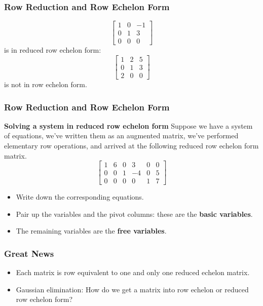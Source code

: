   \begin{frame}[fragile]\frametitle{Row Reduction and Row Echelon Form}
\[
\begin{bmatrix}
 1 & 0 & -1 \\
 0 & 1 & 3 \\
 0 & 0 & 0
\end{bmatrix}
\] 
is in reduced row echelon form:
\[
\begin{bmatrix}
 1 & 2 & 5 \\
 0 & 1 & 3 \\
 2 & 0 & 0
\end{bmatrix}
\] 
is not in row echelon form.
\end{frame}

  \begin{frame}[fragile]\frametitle{Row Reduction and Row Echelon Form}

\textbf{Solving a system in reduced row echelon form}
Suppose we have a system of equations, we've written them as an 
augmented matrix, we've performed elementary row operations, and arrived
at the following reduced row echelon form matrix.  
\[
 \begin{bmatrix}
  1 & 6 & 0 & 3 & 0 & 0 \\
  0 & 0 & 1 & -4 & 0 & 5\\
  0 & 0 & 0 & 0 & 1 & 7 
 \end{bmatrix}
 \]
 
 
\begin{itemize}
 \item  Write down the corresponding equations.
 \item  Pair up the variables and the pivot columns: these are the \textbf{basic variables}.
 \item  The remaining variables are the \textbf{free variables}.
\end{itemize}

\end{frame}

  \begin{frame}[fragile]\frametitle{Great News}

\begin{itemize}
 \item  Each matrix is row equivalent to one and only one reduced echelon matrix.
\item Gaussian elimination: How do we get a matrix into row echelon or reduced row echelon form?
\end{itemize}
\end{frame}


